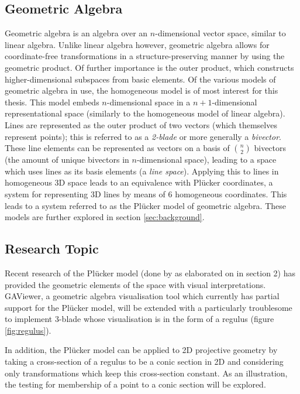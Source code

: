 \documentclass[a4paper, 10pt]{article}
\begin{document}
\subsection{Geometric Algebra}
Geometric algebra\cite{dorst2009geometric} is an algebra over an $n$-dimensional
vector space, similar to
linear algebra. Unlike linear algebra however, geometric algebra allows for
coordinate-free transformations in a structure-preserving manner by using the
geometric product. Of further importance is the outer product, which constructs
higher-dimensional subspaces from basic elements. Of the various models of
geometric algebra in use, the homogeneous model is of most interest for this thesis.
This model embeds $n$-dimensional space in a $n + 1$-dimensional representational
space (similarly to the homogeneous model of linear algebra).  Lines are
represented as the outer product of two vectors (which themselves represent
points); this is referred to as a \emph{2-blade} or more generally a
\emph{bivector}. These line elements can be represented as vectors on a basis of
$n \choose 2$ bivectors (the amount of unique bivectors in $n$-dimensional
space), leading to a space which uses lines as its basis elements (a \emph{line
space}). Applying this to lines in homogeneous 3D space leads to an equivalence
with Pl\"{u}cker coordinates, a system for representing 3D lines by means of 6
homogeneous coordinates. This leads to a system referred to as the Pl\"{u}cker
model of geometric algebra. These models are further explored in section
\ref{sec:background}.

\subsection{Research Topic}
Recent research of the Pl\"{u}cker model (done by \cite{hangbo2011}
\cite{dorst2013versors} \cite{pottmann2001computational} \cite{dekok2012} as
elaborated on in section 2) has provided the geometric elements of the space
with visual interpretations. GAViewer, a geometric algebra visualisation tool
which currently has partial support for the Pl\"{u}cker model, will be extended
with a particularly troublesome to implement 3-blade whose visualisation is in
the form of a regulus (figure \ref{fig:regulus}).

In addition, the Pl\"{u}cker model can be applied to 2D projective geometry by
taking a cross-section of a regulus to be a conic section in 2D and considering
only transformations which keep this cross-section constant. 
As an illustration, the testing for membership of a point to a conic section
will be explored.
\end{document}
